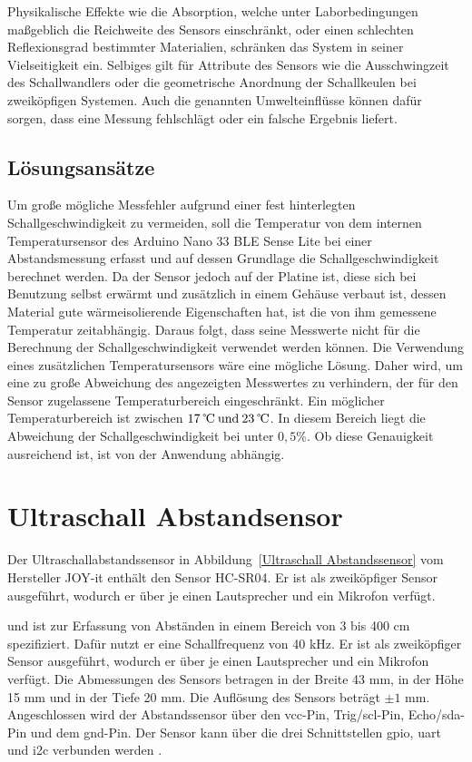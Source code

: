 Physikalische Effekte wie die Absorption, welche unter Laborbedingungen maßgeblich die Reichweite des Sensors einschränkt, oder einen schlechten Reflexionsgrad bestimmter Materialien, schränken das System in seiner Vielseitigkeit ein. Selbiges gilt für Attribute des Sensors wie die Ausschwingzeit des Schallwandlers oder die geometrische Anordnung der Schallkeulen bei zweiköpfigen Systemen.
Auch die genannten Umwelteinflüsse können dafür sorgen, dass eine Messung fehlschlägt oder ein falsche Ergebnis liefert.

\subsection{Lösungsansätze}

Um große mögliche Messfehler aufgrund einer fest hinterlegten Schallgeschwindigkeit zu vermeiden, soll die Temperatur von dem internen Temperatursensor des Arduino Nano 33 BLE Sense Lite bei einer Abstandsmessung erfasst und auf dessen Grundlage die Schallgeschwindigkeit berechnet werden. Da der Sensor jedoch auf der Platine ist, diese sich bei Benutzung selbst erwärmt und zusätzlich in einem Gehäuse verbaut ist, dessen Material gute wärmeisolierende Eigenschaften hat, ist die von ihm gemessene Temperatur zeitabhängig. Daraus folgt, dass seine Messwerte nicht für die Berechnung der Schallgeschwindigkeit verwendet werden können.
Die Verwendung eines zusätzlichen Temperatursensors wäre eine mögliche Lösung. Daher wird, um eine zu große Abweichung des angezeigten Messwertes zu verhindern, der für den Sensor zugelassene Temperaturbereich eingeschränkt. Ein möglicher Temperaturbereich ist zwischen $17 \:\text{\textcelsius \:und} \:23 \:\text{\textcelsius}$. In diesem Bereich liegt die Abweichung der Schallgeschwindigkeit bei unter $0,5\%$. Ob diese Genauigkeit ausreichend ist, ist von der Anwendung abhängig.


\section{Ultraschall Abstandsensor}

Der Ultraschallabstandssensor in Abbildung~\ref{Ultraschall Abstandssensor} vom Hersteller JOY-it enthält den Sensor HC-SR04. Er ist als zweiköpfiger Sensor ausgeführt, wodurch er über je einen Lautsprecher und ein Mikrofon verfügt.

 und ist  zur Erfassung von Abständen in einem Bereich von 3 bis 400 cm spezifiziert. Dafür nutzt er eine Schallfrequenz von 40 kHz. Er ist als zweiköpfiger Sensor ausgeführt, wodurch er über je einen Lautsprecher und ein Mikrofon verfügt.  Die Abmessungen des Sensors betragen in der Breite 43 mm, in der Höhe 15 mm und in der Tiefe 20 mm. Die Auflösung des Sensors beträgt $\pm 1$ mm. Angeschlossen wird der Abstandssensor über den \ac{vcc}-Pin, Trig/\ac{scl}-Pin, Echo/\ac{sda}-Pin und dem \ac{gnd}-Pin. Der Sensor kann über die drei Schnittstellen \ac{gpio}, \ac{uart} und \ac{i2c} verbunden werden \cite{Simac:2017}. 

